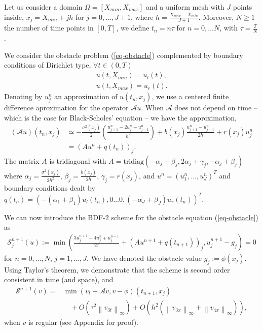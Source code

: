 \documentclass[12pt,a4paper]{article}
\newcommand{\ninf}[1]{\left\| {#1} \right\|_\infty}
\begin{document}
Let us consider a domain $\Omega = [X_{min}, X_{max}]$ and a uniform mesh with $J$ points inside, $x_j = X_{min} + jh$ for $j = 0, \dots, J+1$, where $h = \frac{X_{max} - X_{min}}{J+1}$. Moreover, $N \geq 1$ the number of time points in $[0,T]$, we define $t_n = n \tau$ for $n = 0, \dots N$, with $\tau = \frac{T}{N}$.

We consider the obstacle problem (\ref{eq-obstacle}) complemented by boundary conditions of Dirichlet type, $\forall t \in (0,T)$
\begin{align} 
	u(t, X_{min}) = u_l(t), \label{eq-obstacle_ul}\\
	u(t, X_{max}) = u_r(t). \label{eq-obstacle_ur}
\end{align}
Denoting by $u_j^n$ an approximation of $u(t_n, x_j)$, we use a centered finite difference aproximation for the operator $\mathcal{A} u$. When $\mathcal{A}$ does not depend on time -- which is the case for Black-Scholes' equation -- we have the approximation,
\begin{align*}
	(\mathcal{A} u)(t_n, x_j) &\simeq - \frac{\sigma^2(x_j)}{2} \left( \frac{u_{j+1}^n - 2u_j^n + u_{j-1}^n}{h^2} \right) + b(x_j) \frac{u_{j+1}^n - u_{j-1}^n}{2h} + r(x_j) u_j^n \\
	& = \left( A u^n + q(t_n) \right)_j.
\end{align*}
The matrix $A$ is tridiagonal with $A = \text{tridiag} \left( -\alpha_j-\beta_j, 2\alpha_j + \gamma_j, -\alpha_j+\beta_j \right)$ where $\alpha_j = \frac{\sigma^2(x_j)}{2h^2}$, $\beta_j = \frac{b(x_j)}{2h}$, $\gamma_j = r(x_j)$, and $u^n = (u_1^n, \dots, u_J^n)^T$ and boundary conditions dealt by $q(t_n) = \left( -(\alpha_1+\beta_1) u_l(t_n), 0 \dots 0, (-\alpha_J+\beta_J) u_r(t_n) \right)^T$.

We can now introduce the BDF-2 scheme for the obstacle equation (\ref{eq-obstacle}) as
\begin{align}
	\mathcal{S}_j^{n+1} (u) := \min\left( \frac{3 u_j^{n+1} - 4 u_j^n + u_j^{n-1}}{2 \tau} + (A u^{n+1} + q(t_{n+1}))_j, u_j^{n+1} - g_j \right) = 0 \label{eq-BDF2}
\end{align}
for $n=0,\dots,N$, $j=1,\dots,J$. We have denoted the obstacle value $g_j := \phi(x_j)$. Using Taylor's theorem, we demonstrate that the scheme is second order consistent in time (and space), and
\begin{align*}
	\mathcal{S}^{n+1} (v) = & \min (v_t + \mathcal{A}v, v-\phi)(t_{n+1}, x_j) \\ 
		& \quad + O(\tau^2 \ninf{v_{3t}}) + O(h^2 (\ninf{v_{3x}} + \ninf{v_{4x}})),
\end{align*}
when $v$ is regular (see Appendix for proof). 
\end{document}
